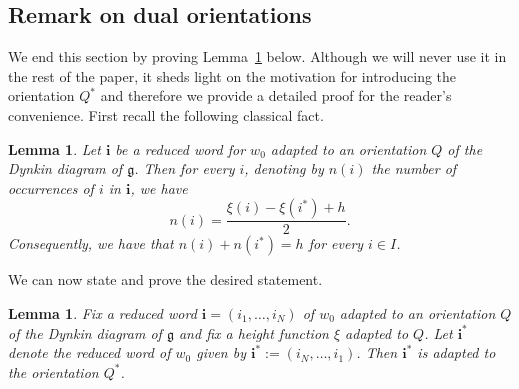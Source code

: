 \documentclass[12pt]{amsart}
\theoremstyle{plain}
\newtheorem{lemma}[theorem]{Lemma}
\theoremstyle{definition}
\numberwithin{equation}{section}
\begin{document}
\subsection{Remark on dual orientations}
 \label{sec : rk on dual orientations}

 We end this section by proving Lemma~\ref{lem : reduced word adapted to Qstar} below. Although we will never use it in the rest of the paper, it sheds light on the motivation for introducing the orientation $Q^{*}$ and therefore we provide a detailed proof for the reader's convenience. First recall the following classical fact. 
  
 \begin{lemma} \label{lem : number of occ}
 Let $\mathbf{i}$ be a reduced word for $w_0$ adapted to an orientation $Q$ of the Dynkin diagram of $\mathfrak{g}$. Then for every $i$, denoting by $n(i)$ the number of occurrences of $i$ in $\mathbf{i}$, we have
  $$ n(i) = \frac{\xi(i)-\xi(i^{*})+h}{2} .  $$
  Consequently, we have that $n(i) + n(i^{*}) = h$ for every $i \in I$.
 \end{lemma}

We can now state and prove the desired statement. 

 \begin{lemma} \label{lem : reduced word adapted to Qstar}
   Fix a reduced word $\mathbf{i} = (i_1, \ldots , i_N)$ of $w_0$ adapted to an orientation $Q$ of the Dynkin diagram of $\mathfrak{g}$ and fix a height function $\xi$ adapted to $Q$.  Let $\mathbf{i}^{*}$ denote the reduced word of $w_0$ given by $\mathbf{i}^{*} := (i_N , \ldots , i_1)$. Then $\mathbf{i}^{*}$ is adapted to the orientation $Q^{*}$. 
 \end{lemma}
\end{document}
